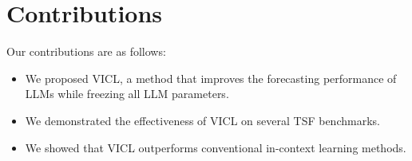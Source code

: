 \documentclass{article}
\begin{document}
\section{Contributions}
Our contributions are as follows:
\begin{itemize}
\item We proposed VICL, a method that improves the forecasting performance of LLMs while freezing all LLM parameters.
\item We demonstrated the effectiveness of VICL on several TSF benchmarks.
\item We showed that VICL outperforms conventional in-context learning methods.
\end{itemize}
\end{document}
